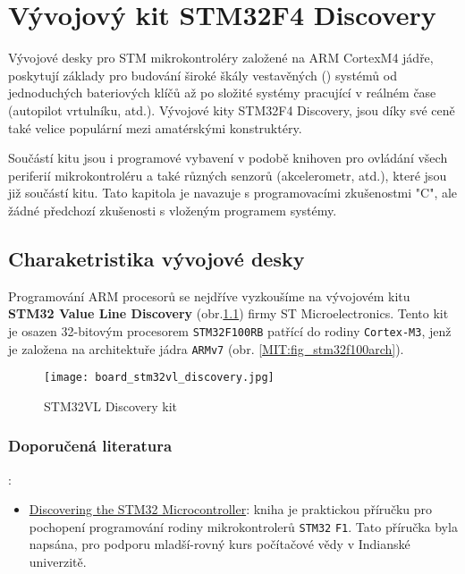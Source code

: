 \chapter{Vývojový kit STM32F4 Discovery}
\minitoc
  Vývojové desky pro STM mikrokontroléry založené na ARM CortexM4 jádře, poskytují základy pro 
  budování široké škály vestavěných (\wikiEmbedded) systémů od jednoduchých bateriových klíčů až po 
  složité systémy pracující v reálném čase (autopilot vrtulníku, atd.). Vývojové kity STM32F4 
  Discovery, jsou díky své ceně také velice populární mezi amatérskými konstruktéry.
  
  Součástí kitu jsou i programové vybavení v podobě knihoven pro ovládání všech periferií 
  mikrokontroléru a také různých senzorů (akcelerometr, atd.), které jsou již součástí kitu.  
  Tato kapitola je navazuje 
  s programovacími zkušenostmi "C", ale žádné předchozí zkušenosti s vloženým programem
  systémy.
  
  \section{Charaketristika vývojové desky}
    Programování ARM procesorů se nejdříve vyzkoušíme na vývojovém kitu \textbf{STM32 Value Line 
    Discovery} (obr.\ref{MIT:fig_stm32vlkit}) firmy ST Microelectronics. Tento kit je osazen 
    32-bitovým procesorem \texttt{STM32F100RB} patřící do rodiny \texttt{Cortex-M3}, jenž je 
    založena na architektuře jádra \texttt{ARMv7} (obr. \ref{MIT:fig_stm32f100arch}). 
  
    \begin{figure}[ht!] %
      \centering
      \texttt{[image: board\_stm32vl\_discovery.jpg]}
      \caption{STM32VL Discovery kit}
      \label{MIT:fig_stm32vlkit}
    \end{figure}
    
    \subsection{Doporučená literatura}:
    \begin{itemize}
      \item \href{http://librarian/stable.php?id=143}{Discovering the STM32 Microcontroller}: 
            kniha je praktickou příručku pro pochopení programování rodiny mikrokontrolerů 
            \texttt{STM32} \texttt{F1}. Tato příručka byla napsána, pro podporu mladší-rovný kurs 
            počítačové vědy v 
      Indianské univerzitě. 
    \end{itemize}
  
